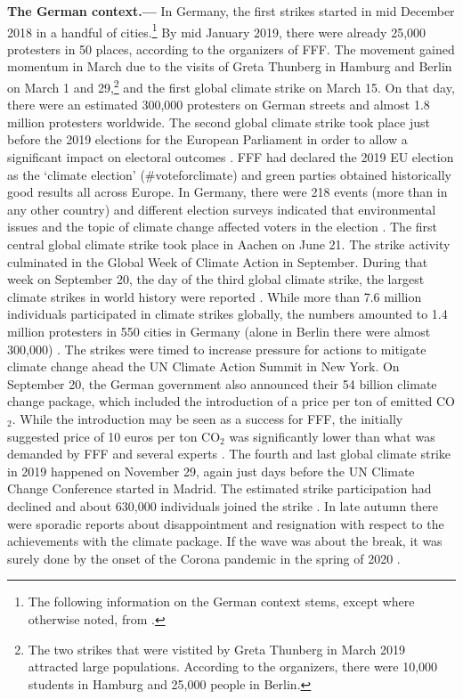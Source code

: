 \textbf{The German context.---} In Germany, the first strikes started in mid December 2018 in a handful of cities.\footnote{The following information on the German context stems, except where otherwise noted, from \cite{sommer2019fridays}.} By mid January 2019, there were already 25,000 protesters in 50 places, according to the organizers of FFF. The movement gained momentum in March due to the visits of Greta Thunberg in Hamburg and Berlin on March 1 and 29,\footnote{The two strikes that were vistited by Greta Thunberg in March 2019 attracted large populations. According to the organizers, there were 10,000 students in Hamburg and 25,000 people in Berlin.} and the first global climate strike on March 15. On that day, there were an estimated 300,000 protesters on German streets and almost 1.8 million protesters worldwide. The second global climate strike took place just before the 2019 elections for the European Parliament in order to allow a significant impact on electoral outcomes \citep{smith2019window}. FFF had declared the 2019 EU election as the `climate election' (\#voteforclimate) and green parties obtained historically good results all across Europe. In Germany, there were 218 events (more than in any other country) and different election surveys indicated that environmental issues and the topic of climate change affected voters in the election \citep{Time2019may24}. The first central global climate strike took place in Aachen on June 21. The strike activity culminated in the Global Week of Climate Action in September. During that week on September 20, the day of the third global climate strike, the largest climate strikes in world history were reported \citep{guardian2019weekofaction}. While more than 7.6 million individuals participated in climate strikes globally, the numbers amounted to 1.4 million protesters in 550 cities in Germany (alone in Berlin there were almost 300,000) \citep{demoor2020protest}. The strikes were timed to increase pressure for actions to mitigate climate change ahead the UN Climate Action Summit in New York. On September 20, the German government also announced their 54 billion climate change package, which included the introduction of a price per ton of emitted CO$_2$. While the introduction may be seen as a success for FFF, the initially suggested price of 10 euros per ton CO$_2$ was significantly lower than what was demanded by FFF and several experts \citep{economist2019klimapaket}. The fourth and last global climate strike in 2019 happened on November 29, again just days before the UN Climate Change Conference started in Madrid. The estimated strike participation had declined and about 630,000 individuals joined the strike \citep{zeit20194cgs}. In late autumn there were sporadic reports about disappointment and resignation with respect to the achievements with the climate package. If the wave was about the break, it was surely done by the onset of the Corona pandemic in the spring of 2020 \citep{ZEIT2020}.



